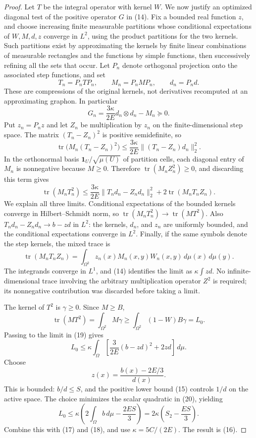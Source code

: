 \begin{proof}
Let \(T\) be the integral operator with kernel \(W\). We now justify an
optimized diagonal test of the positive operator \(G\) in (14). Fix a
bounded real function \(z\), and choose increasing finite measurable
partitions whose conditional expectations of \(W,M,d,z\) converge in
\(L^2\), using the product partitions for the two kernels. Such partitions
exist by approximating the kernels by finite linear combinations of
measurable rectangles and the functions by simple functions, then
successively refining all the sets that occur. Let \(P_n\) denote
orthogonal projection onto the associated step functions, and set
\[
 T_n=P_nTP_n,\qquad M_n=P_nMP_n,\qquad d_n=P_nd.
\]
These are compressions of the original kernels, not derivatives recomputed
at an approximating graphon. In particular
\[
 G_n=\frac{3\kappa}{2E}d_n\otimes d_n-M_n\succeq0.
\]
Put \(z_n=P_nz\) and let \(Z_n\) be
multiplication by \(z_n\) on the finite-dimensional step space. The matrix
\((T_n-Z_n)^2\) is positive semidefinite, so
\[
 \operatorname{tr}\bigl(M_n(T_n-Z_n)^2\bigr)
       \le\frac{3\kappa}{2E}\|(T_n-Z_n)d_n\|_2^2.
\]
In the orthonormal basis \(\mathbf1_U/\sqrt{\mu(U)}\) of partition cells,
each diagonal entry of \(M_n\) is nonnegative because \(M\ge0\).
Therefore \(\operatorname{tr}(M_nZ_n^2)\ge0\), and discarding this term
gives
\begin{equation}
 \operatorname{tr}(M_nT_n^2)
 \le\frac{3\kappa}{2E}\|T_nd_n-Z_nd_n\|_2^2
                 +2\operatorname{tr}(M_nT_nZ_n).\tag{19}
\end{equation}
We explain all three limits. Conditional expectations of the bounded
kernels converge in Hilbert--Schmidt norm, so
\(\operatorname{tr}(M_nT_n^2)\to\operatorname{tr}(MT^2)\). Also
\(T_nd_n-Z_nd_n\to b-zd\) in \(L^2\): the kernels, \(d_n\), and \(z_n\)
are uniformly bounded, and the conditional expectations converge in
\(L^2\). Finally, if the same symbols denote the step kernels, the mixed
trace is
\[
 \operatorname{tr}(M_nT_nZ_n)
   =\int_{\Omega^2}z_n(x)M_n(x,y)W_n(x,y)\,d\mu(x)\,d\mu(y).
\]
The integrands converge in \(L^1\), and (14) identifies the limit as
\(\kappa\int zd\). No infinite-dimensional trace involving the arbitrary
multiplication operator \(Z^2\) is required; its nonnegative contribution
was discarded before taking a limit.

The kernel of \(T^2\) is \(\gamma\ge0\). Since \(M\ge B\),
\[
 \operatorname{tr}(MT^2)=\int_{\Omega^2}M\gamma
       \ge\int_{\Omega^2}(1-W)B\gamma=L_0.
\]
Passing to the limit in (19) gives
\begin{equation}
 L_0\le\kappa\int_\Omega
       \left[\frac{3}{2E}(b-zd)^2+2zd\right]\,d\mu.\tag{20}
\end{equation}
Choose
\[
 z(x)=\frac{b(x)-2E/3}{d(x)}.
\]
This is bounded: \(b/d\le S\), and the positive lower bound (15)
controls \(1/d\) on the active space. The choice minimizes the scalar
quadratic in (20), yielding
\[
 L_0\le\kappa\left(2\int_\Omega b\,d\mu-\frac{2ES}{3}\right)
       =2\kappa\left(S_2-\frac{ES}{3}\right).
\]
Combine this with (17) and (18), and use \(\kappa=5C/(2E)\).
The result is (16).
\end{proof}

